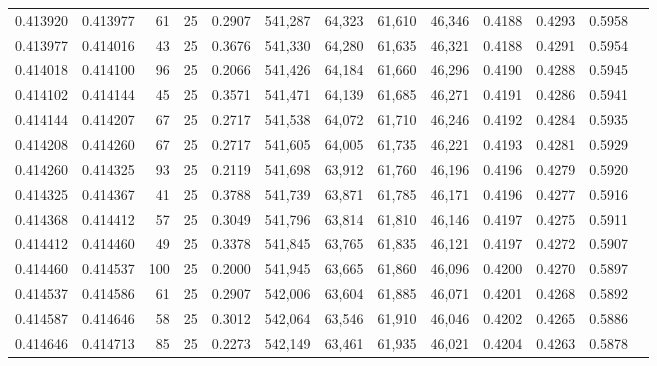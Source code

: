 \begin{tabular}{rrrrrrrrrrrrr}
0.413920 & 0.413977 &    61 &  25 &                                     0.2907 & 541,287 &  64,323 &  61,610 &  46,346 & 0.4188 & 0.4293 & 0.5958 \\
0.413977 & 0.414016 &    43 &  25 &                                     0.3676 & 541,330 &  64,280 &  61,635 &  46,321 & 0.4188 & 0.4291 & 0.5954 \\
0.414018 & 0.414100 &    96 &  25 &                                     0.2066 & 541,426 &  64,184 &  61,660 &  46,296 & 0.4190 & 0.4288 & 0.5945 \\
0.414102 & 0.414144 &    45 &  25 &                                     0.3571 & 541,471 &  64,139 &  61,685 &  46,271 & 0.4191 & 0.4286 & 0.5941 \\
0.414144 & 0.414207 &    67 &  25 &                                     0.2717 & 541,538 &  64,072 &  61,710 &  46,246 & 0.4192 & 0.4284 & 0.5935 \\
0.414208 & 0.414260 &    67 &  25 &                                     0.2717 & 541,605 &  64,005 &  61,735 &  46,221 & 0.4193 & 0.4281 & 0.5929 \\
0.414260 & 0.414325 &    93 &  25 &                                     0.2119 & 541,698 &  63,912 &  61,760 &  46,196 & 0.4196 & 0.4279 & 0.5920 \\
0.414325 & 0.414367 &    41 &  25 &                                     0.3788 & 541,739 &  63,871 &  61,785 &  46,171 & 0.4196 & 0.4277 & 0.5916 \\
0.414368 & 0.414412 &    57 &  25 &                                     0.3049 & 541,796 &  63,814 &  61,810 &  46,146 & 0.4197 & 0.4275 & 0.5911 \\
0.414412 & 0.414460 &    49 &  25 &                                     0.3378 & 541,845 &  63,765 &  61,835 &  46,121 & 0.4197 & 0.4272 & 0.5907 \\
0.414460 & 0.414537 &   100 &  25 &                                     0.2000 & 541,945 &  63,665 &  61,860 &  46,096 & 0.4200 & 0.4270 & 0.5897 \\
0.414537 & 0.414586 &    61 &  25 &                                     0.2907 & 542,006 &  63,604 &  61,885 &  46,071 & 0.4201 & 0.4268 & 0.5892 \\
0.414587 & 0.414646 &    58 &  25 &                                     0.3012 & 542,064 &  63,546 &  61,910 &  46,046 & 0.4202 & 0.4265 & 0.5886 \\
0.414646 & 0.414713 &    85 &  25 &                                     0.2273 & 542,149 &  63,461 &  61,935 &  46,021 & 0.4204 & 0.4263 & 0.5878 \\

\end{tabular}
